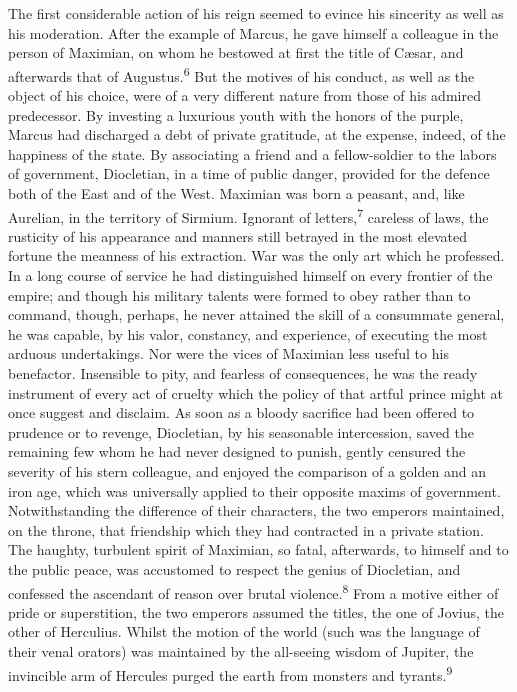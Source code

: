 The first considerable action of his reign seemed to evince his
sincerity as well as his moderation. After the example of Marcus,
he gave himself a colleague in the person of Maximian, on whom he
bestowed at first the title of Cæsar, and afterwards that of
Augustus.\textsuperscript{6} But the motives of his conduct, as well as the object
of his choice, were of a very different nature from those of his
admired predecessor. By investing a luxurious youth with the
honors of the purple, Marcus had discharged a debt of private
gratitude, at the expense, indeed, of the happiness of the state.
By associating a friend and a fellow-soldier to the labors of
government, Diocletian, in a time of public danger, provided for
the defence both of the East and of the West. Maximian was born a
peasant, and, like Aurelian, in the territory of Sirmium.
Ignorant of letters,\textsuperscript{7} careless of laws, the rusticity of his
appearance and manners still betrayed in the most elevated
fortune the meanness of his extraction. War was the only art
which he professed. In a long course of service he had
distinguished himself on every frontier of the empire; and though
his military talents were formed to obey rather than to command,
though, perhaps, he never attained the skill of a consummate
general, he was capable, by his valor, constancy, and experience,
of executing the most arduous undertakings. Nor were the vices of
Maximian less useful to his benefactor. Insensible to pity, and
fearless of consequences, he was the ready instrument of every
act of cruelty which the policy of that artful prince might at
once suggest and disclaim. As soon as a bloody sacrifice had been
offered to prudence or to revenge, Diocletian, by his seasonable
intercession, saved the remaining few whom he had never designed
to punish, gently censured the severity of his stern colleague,
and enjoyed the comparison of a golden and an iron age, which was
universally applied to their opposite maxims of government.
Notwithstanding the difference of their characters, the two
emperors maintained, on the throne, that friendship which they
had contracted in a private station. The haughty, turbulent
spirit of Maximian, so fatal, afterwards, to himself and to the
public peace, was accustomed to respect the genius of Diocletian,
and confessed the ascendant of reason over brutal violence.\textsuperscript{8}
From a motive either of pride or superstition, the two emperors
assumed the titles, the one of Jovius, the other of Herculius.
Whilst the motion of the world (such was the language of their
venal orators) was maintained by the all-seeing wisdom of
Jupiter, the invincible arm of Hercules purged the earth from
monsters and tyrants.\textsuperscript{9}

